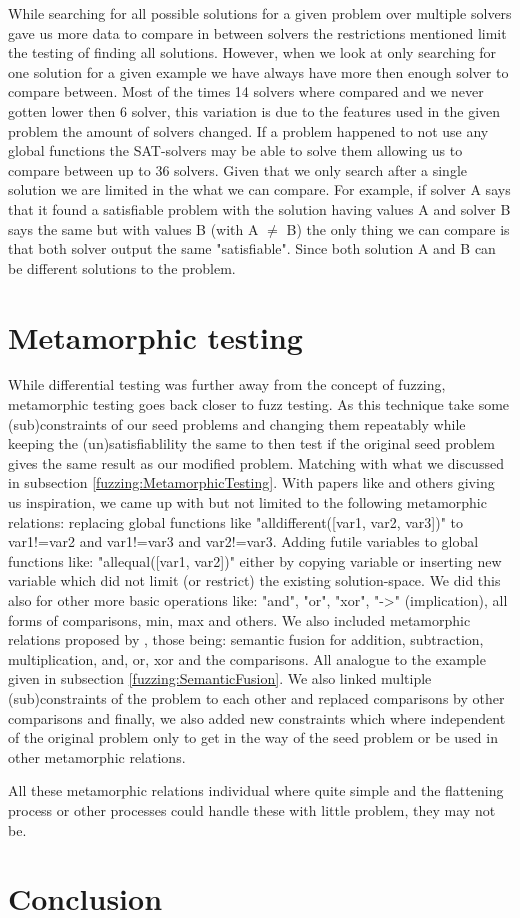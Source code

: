 While searching for all possible solutions for a given problem over multiple solvers gave us more data to compare in between solvers the restrictions mentioned limit the testing of finding all solutions. However, when we look at only searching for one solution for a given example we have always have more then enough solver to compare between. Most of the times 14 solvers where compared and we never gotten lower then 6 solver, this variation is due to the features used in the given problem the amount of solvers changed. If a problem happened to not use any global functions the SAT-solvers may be able to solve them allowing us to compare between up to 36 solvers. Given that we only search after a single solution we are limited in the what we can compare. For example, if solver A says that it found a satisfiable problem with the solution having values A and solver B says the same but with values B (with A $\neq$ B) the only thing we can compare is that both solver output the same "satisfiable". Since both solution A and B can be different solutions to the problem.

\section{Metamorphic testing}
While differential testing was further away from the concept of fuzzing, metamorphic testing goes back closer to fuzz testing. As this technique take some (sub)constraints of our seed problems and changing them repeatably while keeping the (un)satisfiablility the same to then test if the original seed problem gives the same result as our modified problem. Matching with what we discussed in subsection \ref{fuzzing:MetamorphicTesting}. With papers like \cite{50akgun2018metamorphic, 49usman2020testmc, 43YinYang} and others giving us inspiration, we came up with but not limited to the following metamorphic relations: replacing global functions like "alldifferent([var1, var2, var3])" to var1!=var2 and var1!=var3 and var2!=var3. Adding futile variables to global functions like: "allequal([var1, var2])" either by copying variable or inserting new variable which did not limit (or restrict) the existing solution-space. We did this also for other more basic operations like: "and", "or", "xor", "->" (implication), all forms of comparisons, min, max and others. We also included metamorphic relations proposed by \cite{43YinYang}, those being: semantic fusion for addition, subtraction, multiplication, and, or, xor and the comparisons. All analogue to the example given in subsection \ref{fuzzing:SemanticFusion}. We also linked multiple (sub)constraints of the problem to each other and replaced comparisons by other comparisons and finally, we also added new constraints which where independent of the original problem only to get in the way of the seed problem or be used in other metamorphic relations.

All these metamorphic relations individual where quite simple and the flattening process or other processes could handle these with little problem, they may not be. 

\section{Conclusion}
\label{impl:conclusion}

